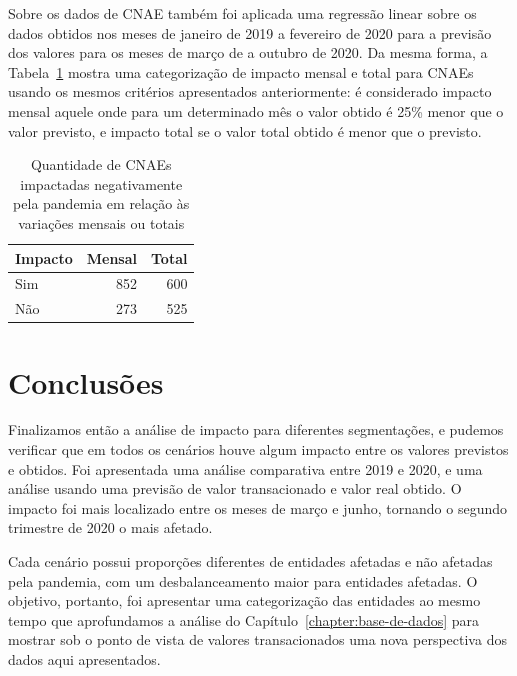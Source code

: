 Sobre os dados de CNAE também foi aplicada uma regressão linear sobre os dados obtidos nos meses de janeiro de 2019 a fevereiro de 2020 para a previsão dos valores para os meses de março de a outubro de 2020. Da mesma forma, a Tabela~\ref{tab:pandemia:impacto-por-cnae} mostra uma categorização de impacto mensal e total para CNAEs usando os mesmos critérios apresentados anteriormente: é considerado impacto mensal aquele onde para um determinado mês o valor obtido é 25\% menor que o valor previsto, e impacto total se o valor total obtido é menor que o previsto.

\begin{table}[htb]
\centering
\caption{Quantidade de CNAEs impactadas negativamente pela pandemia em relação às variações mensais ou totais}
\label{tab:pandemia:impacto-por-cnae}
    \begin{tabular}{l|r|r}
        \toprule
        Impacto & Mensal & Total \\
        \midrule
        Sim & 852 & 600 \\
        Não & 273 & 525 \\
        \bottomrule
    \end{tabular}
\fdadospesquisa
\end{table}

\section{Conclusões}
\label{section:impacto:conclusoes}

Finalizamos então a análise de impacto para diferentes segmentações, e pudemos verificar que em todos os cenários houve algum impacto entre os valores previstos e obtidos. Foi apresentada uma análise comparativa entre 2019 e 2020, e uma análise usando uma previsão de valor transacionado e valor real obtido. O impacto foi mais localizado entre os meses de março e junho, tornando o segundo trimestre de 2020 o mais afetado.

Cada cenário possui proporções diferentes de entidades afetadas e não afetadas pela pandemia, com um desbalanceamento maior para entidades afetadas. O objetivo, portanto, foi apresentar uma categorização das entidades ao mesmo tempo que aprofundamos a análise do Capítulo~\ref{chapter:base-de-dados} para mostrar sob o ponto de vista de valores transacionados uma nova perspectiva dos dados aqui apresentados.
